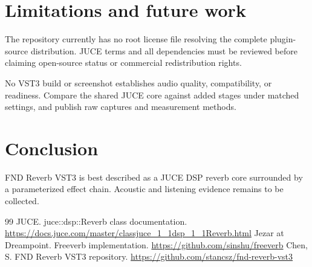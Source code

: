 \documentclass[11pt]{article}
\begin{document}
\section{Limitations and future work}
The repository currently has no root license file resolving the complete plugin-source distribution. JUCE terms and all dependencies must be reviewed before claiming open-source status or commercial redistribution rights.\par
No VST3 build or screenshot establishes audio quality, compatibility, or readiness. Compare the shared JUCE core against added stages under matched settings, and publish raw captures and measurement methods.\par
\section{Conclusion}
FND Reverb VST3 is best described as a JUCE DSP reverb core surrounded by a parameterized effect chain. Acoustic and listening evidence remains to be collected.\par
\begin{thebibliography}{99}
 JUCE. juce::dsp::Reverb class documentation. \url{https://docs.juce.com/master/classjuce_1_1dsp_1_1Reverb.html}
 Jezar at Dreampoint. Freeverb implementation. \url{https://github.com/sinshu/freeverb}
 Chen, S. FND Reverb VST3 repository. \url{https://github.com/stancsz/fnd-reverb-vst3}
\end{thebibliography}
\end{document}

